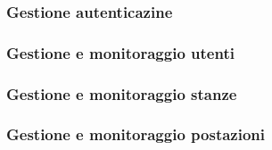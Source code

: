 \subsubsection{Gestione autenticazine}\label{sec:GestioneAutenticazine}


\subsubsection{Gestione e monitoraggio utenti}\label{sec:GMUtenti}


\subsubsection{Gestione e monitoraggio stanze}\label{sec:GMStanze}


\subsubsection{Gestione e monitoraggio postazioni}\label{sec:GMPostazioni}
